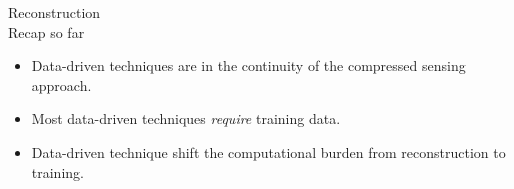 \begin{frame}{Reconstruction\\[-3mm] {\normalsize Recap so far}}
\begin{itemize}
\item Data-driven techniques are in the continuity of the compressed sensing approach.
\item Most data-driven techniques \textit{require} training data.
\item Data-driven technique shift the computational burden from reconstruction to training.
\end{itemize}
\end{frame}

%	


    
    
